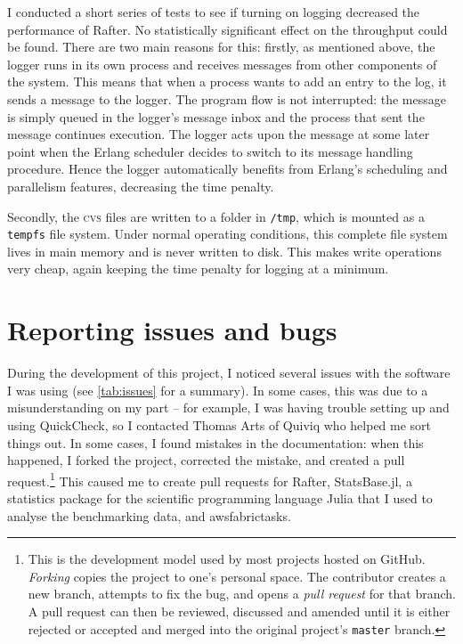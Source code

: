 \documentclass[12pt,chapterprefix=true,toc=bibliography,numbers=noendperiod,
               footnotes=multiple,twoside]{scrreprt}
\begin{document}
I conducted a short series of tests to see if turning on logging decreased the performance of Rafter. No statistically significant effect on the throughput could be found. There are two main reasons for this: firstly, as mentioned above, the logger runs in its own process and receives messages from other components of the system. This means that when a process wants to add an entry to the log, it sends a message to the logger. The program flow is not interrupted: the message is simply queued in the logger's message inbox and the process that sent the message continues execution. The logger acts upon the message at some later point when the Erlang scheduler decides to switch to its message handling procedure. Hence the logger automatically benefits from Erlang's scheduling and parallelism features, decreasing the time penalty.

Secondly, the \textsc{cvs} files are written to a folder in \texttt{/tmp}, which is mounted as a \texttt{tempfs} file system. Under normal operating conditions, this complete file system lives in main memory and is never written to disk. This makes write operations very cheap, again keeping the time penalty for logging at a minimum.

\section{Reporting issues and bugs}

During the development of this project, I noticed several issues with the software I was using (see \cref{tab:issues} for a summary). In some cases, this was due to a misunderstanding on my part -- for example, I was having trouble setting up and using QuickCheck, so I contacted Thomas Arts of Quiviq who helped me sort things out. In some cases, I found mistakes in the documentation: when this happened, I forked the project, corrected the mistake, and created a pull request.\footnote{This is the development model used by most projects hosted on GitHub. \emph{Forking} copies the project to one's personal space. The contributor creates a new branch, attempts to fix the bug, and opens a \emph{pull request} for that branch. A pull request can then be reviewed, discussed and amended until it is either rejected or accepted and merged into the original project's \texttt{master} branch.} This caused me to create pull requests for Rafter, StatsBase.jl, a statistics package for the scientific programming language Julia that I used to analyse the benchmarking data, and awsfabrictasks.
\end{document}
